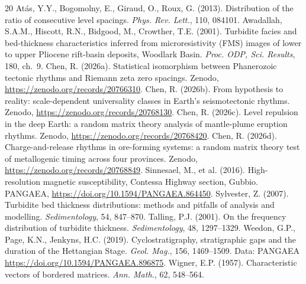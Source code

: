 \documentclass[12pt,a4paper]{article}
\begin{document}
\begin{thebibliography}{20}
 At\'as, Y.Y., Bogomolny, E., Giraud, O., Roux, G. (2013). Distribution of the ratio of consecutive level spacings. \textit{Phys. Rev. Lett.}, 110, 084101.
 Awadallah, S.A.M., Hiscott, R.N., Bidgood, M., Crowther, T.E. (2001). Turbidite facies and bed-thickness characteristics inferred from microresistivity (FMS) images of lower to upper Pliocene rift-basin deposits, Woodlark Basin. \textit{Proc. ODP, Sci. Results}, 180, ch.~9.
 Chen, R. (2026a). Statistical isomorphism between Phanerozoic tectonic rhythms and Riemann zeta zero spacings. Zenodo, \url{https://zenodo.org/records/20766310}.
 Chen, R. (2026b). From hypothesis to reality: scale-dependent universality classes in Earth's seismotectonic rhythms. Zenodo, \url{https://zenodo.org/records/20768130}.
 Chen, R. (2026c). Level repulsion in the deep Earth: a random matrix theory analysis of mantle-plume eruption rhythms. Zenodo, \url{https://zenodo.org/records/20768420}.
 Chen, R. (2026d). Charge-and-release rhythms in ore-forming systems: a random matrix theory test of metallogenic timing across four provinces. Zenodo, \url{https://zenodo.org/records/20768849}.
 Sinnesael, M., et al. (2016). High-resolution magnetic susceptibility, Contessa Highway section, Gubbio. PANGAEA, \url{https://doi.org/10.1594/PANGAEA.864450}.
 Sylvester, Z. (2007). Turbidite bed thickness distributions: methods and pitfalls of analysis and modelling. \textit{Sedimentology}, 54, 847--870.
 Talling, P.J. (2001). On the frequency distribution of turbidite thickness. \textit{Sedimentology}, 48, 1297--1329.
 Weedon, G.P., Page, K.N., Jenkyns, H.C. (2019). Cyclostratigraphy, stratigraphic gaps and the duration of the Hettangian Stage. \textit{Geol. Mag.}, 156, 1469--1509. Data: PANGAEA \url{https://doi.org/10.1594/PANGAEA.896875}.
 Wigner, E.P. (1957). Characteristic vectors of bordered matrices. \textit{Ann. Math.}, 62, 548--564.
\end{thebibliography}
\end{document}
